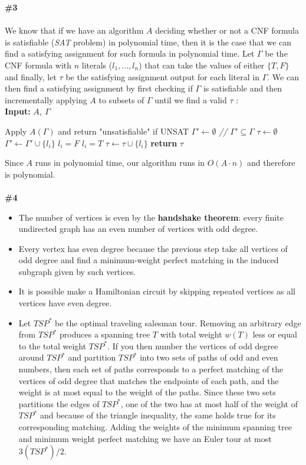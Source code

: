 \documentclass{article}
\begin{document}
\textbf{\#3}
\\
\\
We know that if we have an algorithm $A$ deciding whether or not a CNF formula is satisfiable (\textit{SAT} problem) in polynomial time, then it is the case that we can find a satisfying assignment for such formula in polynomial time. Let $\Gamma$ be the CNF formula with $n$ literals ($l_1, ..., l_n$) that can take the values of either $\{ T, F\}$ and finally, let $\tau$ be the satisfying assignment output for each literal in $\Gamma$. We can then find a satisfying assignment by first checking if $\Gamma$ is satisfiable and then incrementally applying $A$ to subsets of $\Gamma$ until we find a valid $\tau$	:
\\
\newpage
\textbf{Input:} \textit{$A$, $\Gamma$}
\begin{algorithmic}
\State Apply $A(\Gamma)$ and return "unsatisfiable" if UNSAT
\State $\Gamma' \gets \emptyset$ \textit{ // $\Gamma' \subseteq \Gamma$}
\State $\tau \gets \emptyset$
  \State $\Gamma' \gets \Gamma' \cup \{l_i\}$
  \State $l_i = F$
    \State $l_i = T$
  \EndIf
  \State $\tau \gets \tau \cup \{ l_i\}$
\EndFor
\State \textbf{return} $\tau$\\
\end{algorithmic}
Since $A$ runs in polynomial time, our algorithm runs in $O(A \cdot n)$ and therefore is polynomial.
\\
\\
\textbf{\#4}
\begin{itemize}
\item The number of vertices is even by the \textbf{handshake theorem}: every finite undirected graph has an even number of vertices with odd degree.
\item Every vertex has even degree because the previous step take all vertices of odd degree and find a minimum-weight perfect matching in the induced subgraph given by such vertices.
\item It is possible make a Hamiltonian circuit by skipping repeated vertices as all vertices have even degree.
\item Let $TSP^*$ be the optimal traveling salesman tour. Removing an arbitrary edge from $TSP^*$ produces a spanning tree $T$ with total weight $w(T)$ less or equal to the total weight $TSP^*$. If you then number the vertices of odd degree around $TSP^*$ and partition $TSP^*$ into two sets of paths of odd and even numbers, then each set of paths corresponds to a perfect matching of the vertices of odd degree that matches the endpoints of each path, and the weight is at most equal to the weight of the paths. Since these two sets partitions the edges of $TSP^*$, one of the two has at most half of the weight of $TSP^*$ and because of the triangle inequality, the same holds true for its corresponding matching. Adding the weights of the minimum spanning tree and minimum weight perfect matching we have an Euler tour at most $3(TSP^*)/2$.
\\
\end{itemize}
\end{document}
